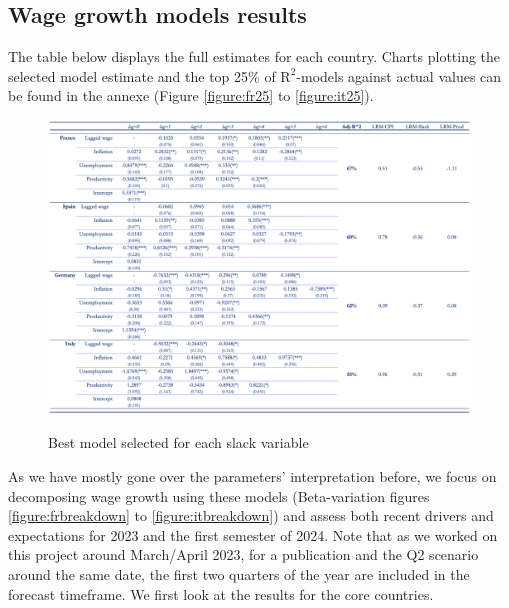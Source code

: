 \subsection{Wage growth models results}

\quad The table below displays the full estimates for each country. 
Charts plotting the selected model estimate and the top 25\% of $\textrm{R}^{2}$-models against actual values can be found in the annexe (Figure \ref{figure:fr25} to \ref{figure:it25}).

\begin{figure}[H]
    \centering
    \caption{Best model selected for each slack variable}
    \includegraphics[width=.87\textwidth]{Core/2.Labour/img/labour_results.png}
    \label{figure:labour_results}
\end{figure}
\vspace{-1cm}
As we have mostly gone over the parameters’ interpretation before, we focus on decomposing wage growth using these models (Beta-variation figures \ref{figure:frbreakdown} to \ref{figure:itbreakdown}) and assess both recent drivers and expectations for 2023 and the first semester of 2024. 
Note that as we worked on this project around March/April 2023, for a publication and the Q2 scenario around the same date, the first two quarters of the year are included in the forecast timeframe. 
We first look at the results for the core countries.

